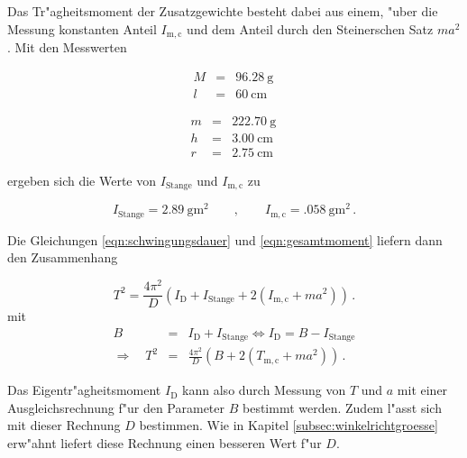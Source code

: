 		Das Tr"agheitsmoment der Zusatzgewichte besteht dabei aus einem, "uber die Messung konstanten Anteil $I_\mathrm{m,c}$ und dem Anteil durch den Steinerschen Satz $ma^2$.
		Mit den Messwerten
		
		\begin{figure}[h!]
			\begin{minipage}[t]{7cm}
				\begin{eqnarray*}
					M & = & \SI{96.28}{\gram} \, \\
					l & = & \SI{60}{\centi \meter} \,
				\end{eqnarray*}
			\end{minipage}
			\hfill
			\begin{minipage}[t]{7cm}
				\begin{eqnarray*}
					m & = & \SI{222.70}{\gram} \, \\
					h & = & \SI{3.00}{\centi \meter} \, \\
					r & = & \SI{2.75}{\centi \meter} \,
				\end{eqnarray*}
			\end{minipage}
		\end{figure}

		ergeben sich die Werte von $I_\mathrm{Stange}$ und $I_\mathrm{m,c}$ zu

		\begin{equation*}
			I_\mathrm{Stange} = \SI{2.89}{\gram \meter \squared} \qquad , \qquad I_\mathrm{m,c} = \SI{.058}{\gram \meter \squared} \,.
		\end{equation*}

		Die Gleichungen \eqref{eqn:schwingungsdauer} und \eqref{eqn:gesamtmoment} liefern dann den Zusammenhang

		\begin{equation*}
			T^2 = \frac{4 \pi^2}{D} \left(I_\mathrm{D} + I_\mathrm{Stange} + 2\left(I_\mathrm{m,c} + ma^2 \right)\right) \,.
		\end{equation*}
		mit
		\begin{eqnarray*}
			B & = & I_\mathrm{D} + I_\mathrm{Stange} \Leftrightarrow I_\mathrm{D} = B - I_\mathrm{Stange} \\
			\Rightarrow \quad T^2 & = & \frac{4\pi^2}{D}\left(B + 2\left(T_\mathrm{m,c} + ma^2\right)\right) \,.
		\end{eqnarray*}

		Das Eigentr"agheitsmoment $I_\mathrm{D}$ kann also durch Messung von $T$ und $a$ mit einer Ausgleichsrechnung f"ur den Parameter $B$ bestimmt werden.
		Zudem l"asst sich mit dieser Rechnung $D$ bestimmen.
		Wie in Kapitel \ref{subsec:winkelrichtgroesse} erw"ahnt liefert diese Rechnung einen besseren Wert f"ur $D$.

